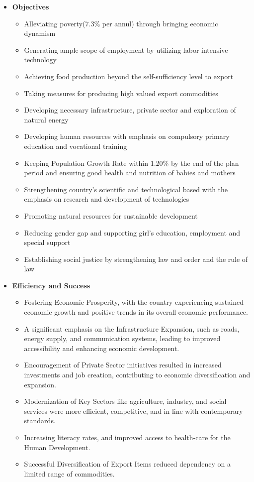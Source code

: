 \begin{itemize}
	\item\textbf{Objectives}
	\begin{itemize}
		\item Alleviating poverty(7.3\% per annul) through bringing economic dynamism
		\item Generating ample scope of employment by utilizing labor intensive technology
		\item Achieving food production beyond the self-sufficiency level to export
		\item Taking measures for producing high valued export commodities
		\item Developing necessary infrastructure, private sector and exploration of natural energy
		\item Developing human resources with emphasis on compulsory primary education and vocational training
		\item Keeping Population Growth Rate within 1.20\% by the end of the plan period and 
		ensuring good health and nutrition of babies and mothers
		\item Strengthening country's scientific and technological based with the emphasis on research 
		and development of technologies
		\item Promoting natural resources for sustainable development
		\item Reducing gender gap and supporting girl's education, employment and special support
		\item Establishing social justice by strengthening law and order and the rule of law
	\end{itemize}
	
	\item\textbf{Efficiency and Success}
	\begin{itemize}
		\item Fostering Economic Prosperity, with the country experiencing sustained economic 
		growth and positive trends in its overall economic performance.
		\item A significant emphasis on the Infrastructure Expansion, such as roads, energy supply, 
		and communication systems, leading to improved accessibility and enhancing economic development.
		\item Encouragement of Private Sector initiatives resulted in increased investments and job creation, 
		contributing to economic diversification and expansion.
		\item Modernization of Key Sectors like agriculture, industry, and social services were more efficient, 
		competitive, and in line with contemporary standards.
		\item Increasing literacy rates, and improved access to health-care for the Human Development.
		\item Successful Diversification of Export Items reduced dependency on a limited range of commodities.
	\end{itemize}
	

\end{itemize}
